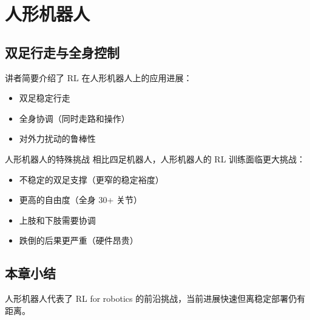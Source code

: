 \section{人形机器人}

\subsection{双足行走与全身控制}

讲者简要介绍了 RL 在人形机器人上的应用进展：
\begin{itemize}
    \item 双足稳定行走
    \item 全身协调（同时走路和操作）
    \item 对外力扰动的鲁棒性
\end{itemize}

\begin{knowledgebox}{人形机器人的特殊挑战}
相比四足机器人，人形机器人的 RL 训练面临更大挑战：
\begin{itemize}
    \item 不稳定的双足支撑（更窄的稳定裕度）
    \item 更高的自由度（全身 30+ 关节）
    \item 上肢和下肢需要协调
    \item 跌倒的后果更严重（硬件昂贵）
\end{itemize}
\end{knowledgebox}

\subsection{本章小结}

人形机器人代表了 RL for robotics 的前沿挑战，当前进展快速但离稳定部署仍有距离。

